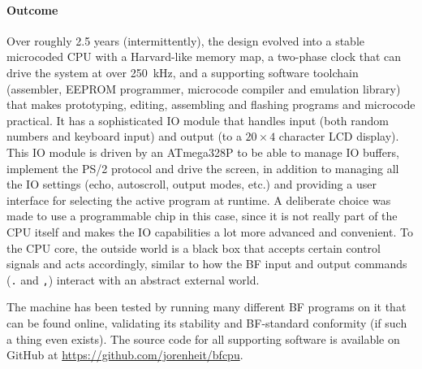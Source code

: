 \paragraph{Outcome}
Over roughly 2.5 years (intermittently), the design evolved into a stable microcoded CPU with a Harvard-like memory map, a two-phase clock that can drive the system at over 250~kHz, and a supporting software toolchain (assembler, EEPROM programmer, microcode compiler and emulation library) that makes prototyping, editing, assembling and flashing programs and microcode practical. It has a sophisticated IO module that handles input (both random numbers and keyboard input) and output (to a $20\times4$ character LCD display). This IO module is driven by an ATmega328P to be able to manage IO buffers, implement the PS/2 protocol and drive the screen, in addition to managing all the IO settings (echo, autoscroll, output modes, etc.) and providing a user interface for selecting the active program at runtime. A deliberate choice was made to use a programmable chip in this case, since it is not really part of the CPU itself and makes the IO capabilities a lot more advanced and convenient. To the CPU core, the outside world is a black box that accepts certain control signals and acts accordingly, similar to how the BF input and output commands (\texttt{.} and \texttt{,}) interact with an abstract external world.

The machine has been tested by running many different BF programs on it that can be found online, validating its stability and BF-standard conformity (if such a thing even exists). The source code for all supporting software is available on GitHub at \url{https://github.com/jorenheit/bfcpu}.

\newpage
